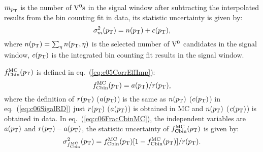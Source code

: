 $m_{p_{\rm T}}$ is the number of ${\rm V}^{0}{\rm s}$ in the signal window after subtracting
the interpolated results from the bin counting fit in data,
its statistic uncertainty is given by:
\begin{equation}\label{eq:c06SigalRD}
\sigma_{m}^{2}(p_{\rm T})=n(p_{\rm T})+c(p_{\rm T}),
\end{equation}
where $n(p_{\rm T})=\sum_{\eta}n(p_{\rm T},\eta)$ is the selected number of ${\rm V}^{0}$
candidates in the signal window,
$c(p_{\rm T})$ is the integrated bin counting fit results in the signal window.

$f_{\rm Cbin}^{\rm MC}(p_{\rm T})$ is defined in eq.~(\ref{eq:c05CorrEffImp}):
\begin{equation}\label{eq:c06FracCbinMC}
f_{\rm Cbin}^{\rm MC}(p_{\rm T})=a(p_{\rm T})/r(p_{\rm T}),
\end{equation}
where the definition of $r(p_{\rm T})$ ($a(p_{\rm T})$) is
the same as $n(p_{\rm T})$ ($c(p_{\rm T})$) in eq.~(\ref{eq:c06SigalRD}) just
$r(p_{\rm T})$ ($a(p_{\rm T})$) is obtained in MC and $n(p_{\rm T})$ ($c(p_{\rm T})$) is obtained
in data.
In eq.~(\ref{eq:c06FracCbinMC}),
the independent variables
are $a(p_{\rm T})$ and $r(p_{\rm T})-a(p_{\rm T})$,
the statistic uncertainty of $f_{\rm Cbin}^{\rm MC}(p_{\rm T})$ is given by:
\begin{equation}
\sigma_{f_{\rm Cbin}^{\rm MC}}^{2}(p_{\rm T})=
f_{\rm Cbin}^{\rm MC}(p_{\rm T})[1-f_{\rm Cbin}^{\rm MC}(p_{\rm T})]/r(p_{\rm T}).
\end{equation}

